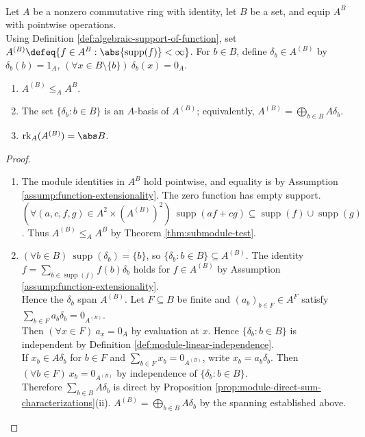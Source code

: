 \begin{theorem} \label{thm:finite-support-functions-free-module} \\
Let $A$ be a nonzero commutative ring with identity, let $B$ be a set, and equip $A^B$ with pointwise operations.\\
Using Definition \ref{def:algebraic-support-of-function}, set $A^{(B)}\defeq\{f\in A^B:\abs{\operatorname{supp}(f)}<\infty\}$. For $b\in B$, define $\delta_b\in A^{(B)}$ by $\delta_b(b)=1_A$, $(\forall x\in B\setminus\{b\})\ \delta_b(x)=0_A$.
\begin{enumerate}[label=(\roman*)]
\setlength{\itemsep}{0pt}
\item $A^{(B)}\leq_A A^B$.
\item The set $\{\delta_b:b\in B\}$ is an $A$-basis of $A^{(B)}$; equivalently, $A^{(B)}=\bigoplus\limits_{b\in B}A\delta_b$.
\item $\operatorname{rk}_A(A^{(B)})=\abs B$.
\end{enumerate}
\begin{proof}
\begin{enumerate}[label=(\roman*)]
\setlength{\itemsep}{0pt}
\item The module identities in $A^B$ hold pointwise, and equality is by Assumption \ref{assump:function-extensionality}. The zero function has empty support.\\
$(\forall(a,c,f,g)\in A^2\times(A^{(B)})^2)\ \operatorname{supp}(af+cg)\subseteq\operatorname{supp}(f)\cup\operatorname{supp}(g)$. Thus $A^{(B)}\leq_A A^B$ by Theorem \ref{thm:submodule-test}.
\item $(\forall b\in B)\ \operatorname{supp}(\delta_b)=\{b\}$, so $\{\delta_b:b\in B\}\subseteq A^{(B)}$. The identity $f=\sum\limits_{b\in\operatorname{supp}(f)}f(b)\delta_b$ holds for $f\in A^{(B)}$ by Assumption \ref{assump:function-extensionality}.\\
Hence the $\delta_b$ span $A^{(B)}$. Let $F\subseteq B$ be finite and $(a_b)_{b\in F}\in A^F$ satisfy $\sum\limits_{b\in F}a_b\delta_b=0_{A^{(B)}}$.\\
Then $(\forall x\in F)\ a_x=0_A$ by evaluation at $x$. Hence $\{\delta_b:b\in B\}$ is independent by Definition \ref{def:module-linear-independence}.\\
If $x_b\in A\delta_b$ for $b\in F$ and $\sum\limits_{b\in F}x_b=0_{A^{(B)}}$, write $x_b=a_b\delta_b$. Then $(\forall b\in F)\ x_b=0_{A^{(B)}}$ by independence of $\{\delta_b:b\in B\}$.\\
Therefore $\sum\limits_{b\in B}A\delta_b$ is direct by Proposition \ref{prop:module-direct-sum-characterizations}(ii). $A^{(B)}=\bigoplus\limits_{b\in B}A\delta_b$ by the spanning established above.

\end{enumerate}
\end{proof}
\end{theorem}
